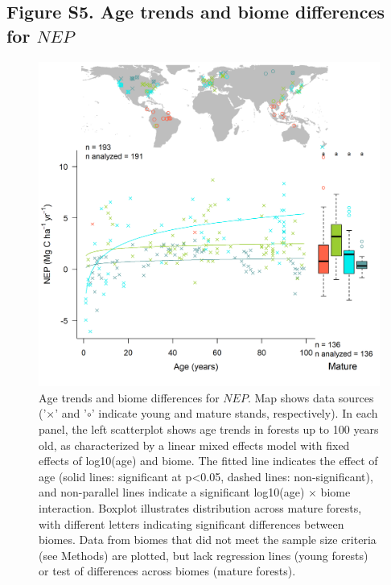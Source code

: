 \documentclass[
]{article}
\begin{document}
\newpage

\hypertarget{figure-s5.-age-trends-and-biome-differences-for-nep}{%
\subsection{\texorpdfstring{Figure S5. Age trends and biome differences
for
\(NEP\)}{Figure S5. Age trends and biome differences for NEP}}\label{figure-s5.-age-trends-and-biome-differences-for-nep}}

\begin{figure}[H]

{\centering \includegraphics[width=1\linewidth]{tables_figures/age_trends/NEP_with_map} 

}

\caption{Age trends and biome differences for $NEP$. Map shows data sources ('$\times$' and '$\circ$' indicate young and mature stands, respectively). In each panel, the left scatterplot shows age trends in forests up to 100 years old, as characterized by a linear mixed effects model with fixed effects of log10(age) and biome. The fitted line indicates the effect of age (solid lines: significant at p<0.05, dashed lines: non-significant), and non-parallel lines indicate a significant log10(age) $\times$ biome interaction. Boxplot illustrates distribution across mature forests, with different letters indicating significant differences between biomes. Data from biomes that did not meet the sample size criteria (see Methods) are plotted, but lack regression lines (young forests) or test of differences across biomes (mature forests).}\label{fig:unnamed-chunk-8}
\end{figure}
\end{document}
